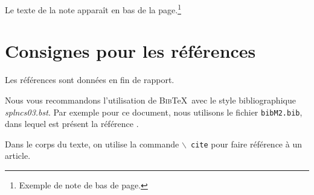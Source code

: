 \documentclass[french]{../cls/llncs}
\begin{document}
Le texte de la note apparaît en bas de la page.\footnote{Exemple de
note de bas de page.}


    \section{Consignes pour les références} \label{sect3}

Les références sont données en fin de rapport.

Nous vous recommandons l'utilisation de
\textsc{Bib}\TeX\ avec le style bibliographique \textit{splncs03.bst}. Par exemple pour ce document, nous utilisons le fichier \texttt{bibM2.bib}, dans lequel est présent la référence \cite{Russell2003}. 
     
Dans le corps du texte, on utilise la commande \texttt{$\backslash$ cite} pour faire référence à un article.  

    \newpage
     
            
\end{document}
